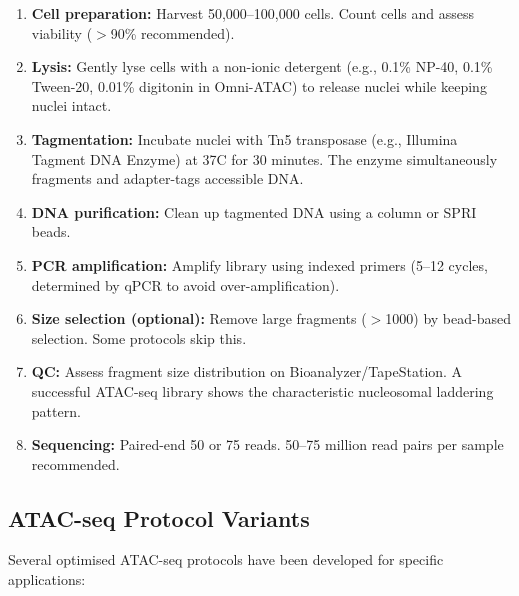 \begin{protocolbox}[title={Standard ATAC-seq Protocol (Omni-ATAC)}]
\begin{enumerate}[itemsep=2pt]
  \item \textbf{Cell preparation:} Harvest 50,000--100,000 cells. Count cells and assess viability ($>$90\% recommended).
  \item \textbf{Lysis:} Gently lyse cells with a non-ionic detergent (e.g., 0.1\% NP-40, 0.1\% Tween-20, 0.01\% digitonin in Omni-ATAC) to release nuclei while keeping nuclei intact.
  \item \textbf{Tagmentation:} Incubate nuclei with Tn5 transposase (e.g., Illumina Tagment DNA Enzyme) at 37\textdegree{}C for 30 minutes. The enzyme simultaneously fragments and adapter-tags accessible DNA.
  \item \textbf{DNA purification:} Clean up tagmented DNA using a column or SPRI beads.
  \item \textbf{PCR amplification:} Amplify library using indexed primers (5--12 cycles, determined by qPCR to avoid over-amplification).
  \item \textbf{Size selection (optional):} Remove large fragments ($>$1000\basepair{}) by bead-based selection. Some protocols skip this.
  \item \textbf{QC:} Assess fragment size distribution on Bioanalyzer/TapeStation. A successful ATAC-seq library shows the characteristic nucleosomal laddering pattern.
  \item \textbf{Sequencing:} Paired-end 50 or 75\basepair{} reads. 50--75 million read pairs per sample recommended.
\end{enumerate}
\end{protocolbox}

\subsection{ATAC-seq Protocol Variants}
\label{subsec:chromatin:atac-variants}

Several optimised ATAC-seq protocols have been developed for specific applications:

